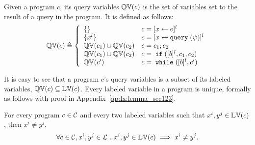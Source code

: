 \begin{defn} 
  \label{def:qvar}
Given a program $c$, its query variables 
$\mathbb{QV}(c)$ is the set of variables set to the result of a query in the program.
It is defined as follows:
{\footnotesize
$$
  \qvar(c) \triangleq
  \left\{
  \begin{array}{ll}
      \{\}                  
      & {c} = [{\assign x \expr}]^{l} 
      \\
      \{{x}^l\}                  
      & {c} = [{\assign x \query(\qexpr)}]^{l} 
      \\
      \qvar(c_1) \cup \qvar(c_2)  
      & {c} = {c_1};{c_2}
      \\
      \qvar(c_1) \cup \qvar(c_2) 
      & {c} =\eif([\bexpr]^{l}, c_1, c_2) 
      \\
      \qvar(c')
      & {c}   = \ewhile ([\bexpr]^{l}, {c}')
\end{array}
\right.
$$
}
\end{defn}
%
It is easy to see that a program $c$'s query variables is a subset of 
its labeled variables, $\mathbb{QV}(c) \subseteq \mathbb{LV}(c)$.
%
%
Every labeled variable in a program is unique, formally as follows with proof in Appendix~\ref{apdx:lemma_sec123}.
\begin{lem}
  \label{lem:lvar_unique}
  For every program $c \in \mathcal{C}$ and every two labeled variables such that
  $x^i, y^j \in \mathbb{LV}(c)$, then $x^i \neq y^j$.
  \[
    \forall c \in \mathcal{C}, x^i, y^j \in \mathcal{L} ~.~ x^i, y^j \in \mathbb{LV}(c)\implies x^i \neq y^j.
    \]
\end{lem}